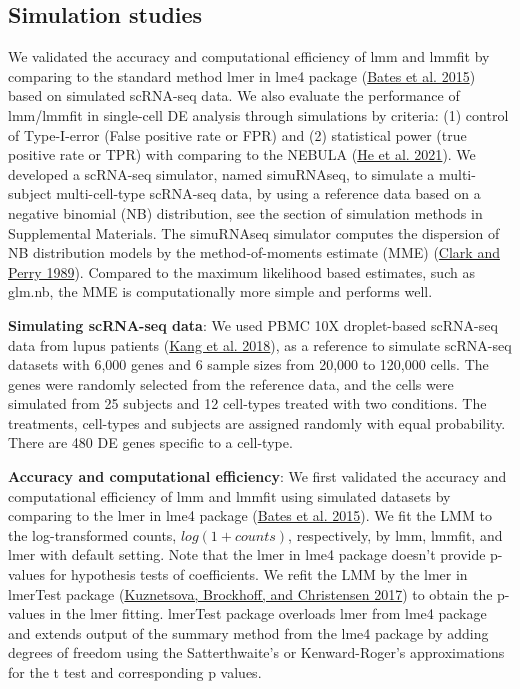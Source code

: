 \documentclass[
]{article}
\begin{document}
\hypertarget{simulation-studies}{%
\subsection{Simulation studies}\label{simulation-studies}}

We validated the accuracy and computational efficiency of lmm and lmmfit
by comparing to the standard method lmer in lme4 package
(\protect\hyperlink{ref-lme4}{Bates et al. 2015}) based on simulated
scRNA-seq data. We also evaluate the performance of lmm/lmmfit in
single-cell DE analysis through simulations by criteria: (1) control of
Type-I-error (False positive rate or FPR) and (2) statistical power
(true positive rate or TPR) with comparing to the NEBULA
(\protect\hyperlink{ref-nebula}{He et al. 2021}). We developed a
scRNA-seq simulator, named simuRNAseq, to simulate a multi-subject
multi-cell-type scRNA-seq data, by using a reference data based on a
negative binomial (NB) distribution, see the section of simulation
methods in Supplemental Materials. The simuRNAseq simulator computes the
dispersion of NB distribution models by the method-of-moments estimate
(MME) (\protect\hyperlink{ref-Clark1989}{Clark and Perry 1989}).
Compared to the maximum likelihood based estimates, such as glm.nb, the
MME is computationally more simple and performs well.

\textbf{Simulating scRNA-seq data}: We used PBMC 10X droplet-based
scRNA-seq data from lupus patients
(\protect\hyperlink{ref-PBMC2018}{Kang et al. 2018}), as a reference to
simulate scRNA-seq datasets with 6,000 genes and 6 sample sizes from
20,000 to 120,000 cells. The genes were randomly selected from the
reference data, and the cells were simulated from 25 subjects and 12
cell-types treated with two conditions. The treatments, cell-types and
subjects are assigned randomly with equal probability. There are 480 DE
genes specific to a cell-type.

\textbf{Accuracy and computational efficiency}: We first validated the
accuracy and computational efficiency of lmm and lmmfit using simulated
datasets by comparing to the lmer in lme4 package
(\protect\hyperlink{ref-lme4}{Bates et al. 2015}). We fit the LMM to the
log-transformed counts, \(log(1 + counts)\), respectively, by lmm,
lmmfit, and lmer with default setting. Note that the lmer in lme4
package doesn't provide p-values for hypothesis tests of coefficients.
We refit the LMM by the lmer in lmerTest package
(\protect\hyperlink{ref-lmerTest}{Kuznetsova, Brockhoff, and Christensen
2017}) to obtain the p-values in the lmer fitting. lmerTest package
overloads lmer from lme4 package and extends output of the summary
method from the lme4 package by adding degrees of freedom using the
Satterthwaite's or Kenward-Roger's approximations for the t test and
corresponding p values.
\end{document}
